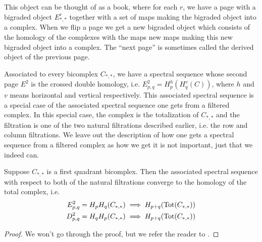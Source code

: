This object can be thought of as a book, where for each $r$, we have a page with a bigraded object $E_{*,*}^r$ together with a set of maps making the bigraded object into a complex. When we flip a page we get a new bigraded object which consists of the homology of the complexes with the maps new maps making this new bigraded object into a complex. The ``next page'' is sometimes called the derived object of the previous page. 



Associated to every bicomplex $C_{*,*}$, we have a spectral sequence whose second page $E^2$ is the crossed double homology, i.e. $E^2_{p,q}=H_p^{h}(H_q^{v}(C))$, where $h$ and $v$ means horizontal and vertical respectively. This associated spectral sequence is a special case of the associated spectral sequence one gets from a filtered complex. In this special case, the complex is the totalization of $C_{*,*}$ and the filtration is one of the two natural filtrations described earlier, i.e. the row and column filtrations. We leave out the description of how one gets a spectral sequence from a filtered complex as how we get it is not important, just that we indeed can.  

\begin{lemma}
Suppose $C_{*,*}$ is a first quadrant bicomplex. %
Then the associated spectral sequence with respect to both of the natural filtrations converge to the homology of the total complex, i.e.
\begin{align*}
    E^2_{p,q} = H_p H_q (C_{*,*}) &\implies H_{p+q}(\operatorname{Tot}(C_{*,*})) \\
    D^2_{p,q} = H_q H_p (C_{*,*}) &\implies H_{p+q}(\operatorname{Tot}(C_{*,*}))
\end{align*}
\end{lemma}
\begin{proof}
We won't go through the proof, but we refer the reader to \cite[theorem 5.5.1]{weibel}.
\end{proof}